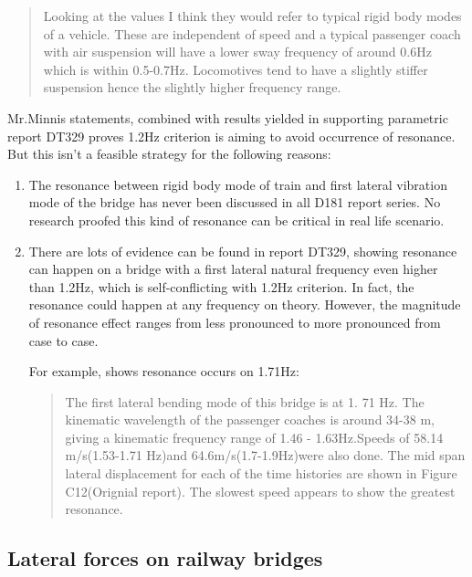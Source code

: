 \begin{quote}
Looking at the values I think they would refer to typical rigid body modes of a vehicle.  These are independent of speed and a typical passenger coach with air suspension will have a lower sway frequency of around 0.6Hz which is within 0.5-0.7Hz.  Locomotives tend to have a slightly stiffer suspension hence the slightly higher frequency range.
\end{quote}

Mr.Minnis statements, combined with results yielded in supporting parametric report DT329 proves 1.2Hz criterion is aiming to avoid occurrence of resonance. But this isn't a feasible strategy for the following reasons:

\begin{enumerate} 
    \item The resonance between rigid body mode of train and first lateral vibration mode of the bridge has never been discussed in all D181 report series. No research proofed this kind of resonance can be critical in real life scenario.

    \item There are lots of evidence can be found in report DT329, showing resonance can happen on a bridge with a first lateral natural frequency even higher than 1.2Hz, which is self-conflicting with 1.2Hz criterion. In fact, the resonance could happen at any frequency on theory. However, the magnitude of resonance effect ranges from less pronounced to more pronounced from case to case.  

    For example, \citet[Page 14,Phase II]{d181dt329} shows resonance occurs on 1.71Hz:
        \begin{quote}
            The first lateral bending mode of this bridge is at 1. 71 Hz. The kinematic wavelength of the passenger coaches is around 34-38 m, giving a kinematic frequency range of 1.46 - 1.63Hz.Speeds of 58.14 m/s(1.53-1.71 Hz)and 64.6m/s(1.7-1.9Hz)were also done. The mid span lateral displacement for each of the time histories are shown in Figure C12(Orignial report). The slowest speed appears to show the greatest resonance.
        \end{quote}
\end{enumerate}

\subsection{Lateral forces on railway bridges}\label{sec:lateralforce329}

